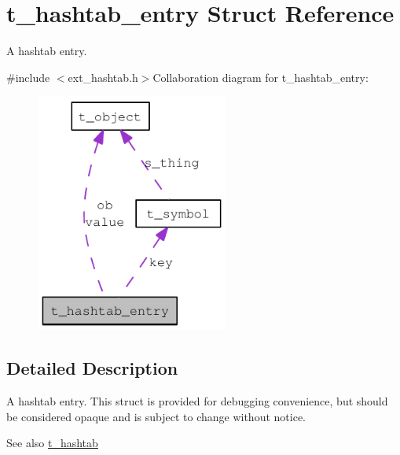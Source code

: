 \hypertarget{structt__hashtab__entry}{
\section{t\_\-hashtab\_\-entry Struct Reference}
\label{structt__hashtab__entry}
}


A hashtab entry.  


{\ttfamily \#include $<$ext\_\-hashtab.h$>$}Collaboration diagram for t\_\-hashtab\_\-entry:\nopagebreak
\begin{figure}[H]
\begin{center}
\leavevmode
\includegraphics[width=179pt]{structt__hashtab__entry__coll__graph}
\end{center}
\end{figure}


\subsection{Detailed Description}
A hashtab entry. This struct is provided for debugging convenience, but should be considered opaque and is subject to change without notice.

\begin{DoxySeeAlso}{See also}
\hyperlink{structt__hashtab}{t\_\-hashtab} 
\end{DoxySeeAlso}
